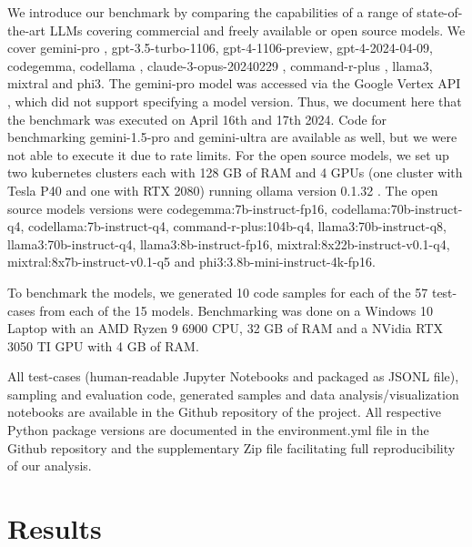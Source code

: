 \documentclass{ecai}
\begin{document}
We introduce our benchmark by comparing the capabilities of a range of state-of-the-art LLMs covering commercial and freely available or open source models. We cover gemini-pro \citep{geminiteam2024gemini}, gpt-3.5-turbo-1106, gpt-4-1106-preview, gpt-4-2024-04-09, codegemma, codellama \citep{roziere2024code}, claude-3-opus-20240229 \citep{anthropic2024claude}, command-r-plus \citep{command_r_plus}, llama3, mixtral and phi3. The gemini-pro model was accessed via the Google Vertex API \citep{google2024vertex}, which did not support specifying a model version. Thus, we document here that the benchmark was executed on April 16th and 17th 2024. Code for benchmarking gemini-1.5-pro and gemini-ultra are available as well, but we were not able to execute it due to rate limits. For the open source models, we set up two kubernetes clusters each with 128 GB of RAM and 4 GPUs (one cluster with Tesla P40 and one with RTX 2080) running ollama version 0.1.32 \citep{ollama2024}. The open source models versions were codegemma:7b-instruct-fp16, codellama:70b-instruct-q4, codellama:7b-instruct-q4, command-r-plus:104b-q4, llama3:70b-instruct-q8, llama3:70b-instruct-q4, llama3:8b-instruct-fp16, mixtral:8x22b-instruct-v0.1-q4, mixtral:8x7b-instruct-v0.1-q5 and phi3:3.8b-mini-instruct-4k-fp16.

To benchmark the models, we generated 10 code samples for each of the 57 test-cases from each of the 15 models. Benchmarking was done on a Windows 10 Laptop with an AMD Ryzen 9 6900 CPU, 32 GB of RAM and a NVidia RTX 3050 TI GPU with 4 GB of RAM.

All test-cases (human-readable Jupyter Notebooks and packaged as JSONL file), sampling and evaluation code, generated samples and data analysis/visualization notebooks are available in the Github repository of the project. All respective Python package versions are documented in the environment.yml file in the Github repository and the supplementary Zip file facilitating full reproducibility of our analysis.





\section{Results}
\end{document}
